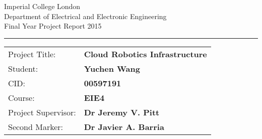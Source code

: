 \documentclass{article}
\begin{document}
\begin{titlepage}
                \setlength{\parindent}{0pt}
                \setlength{\parskip}{0pt}

                {
                                \Large
                                \raggedright
                                Imperial College London\\[17pt]
                                Department of Electrical and Electronic Engineering\\[17pt]
                                Final Year Project Report 2015\\[17pt]
 
                }

                \rule{\columnwidth}{3pt}
                \vfill
                \centering
                \vfill
                \setlength{\tabcolsep}{0pt}

                \begin{tabular}{p{40mm}p{\dimexpr\columnwidth-40mm}}
                                Project Title: & \textbf{Cloud Robotics Infrastructure} \\[12pt]
                                Student: & \textbf{Yuchen Wang} \\[12pt]
                                CID: & \textbf{00597191} \\[12pt]
                                Course: & \textbf{EIE4} \\[12pt]
                                Project Supervisor: & \textbf{Dr Jeremy V. Pitt} \\[12pt]
                                Second Marker: & \textbf{Dr Javier A. Barria} \\
                \end{tabular}
\end{titlepage}






\end{document}
